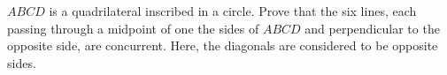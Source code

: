 $ABCD$ is a quadrilateral inscribed in a circle. Prove that the six lines, each passing through a midpoint of one the sides of $ABCD$ and perpendicular to the opposite side, are concurrent. Here, the diagonals are considered to be opposite sides.
